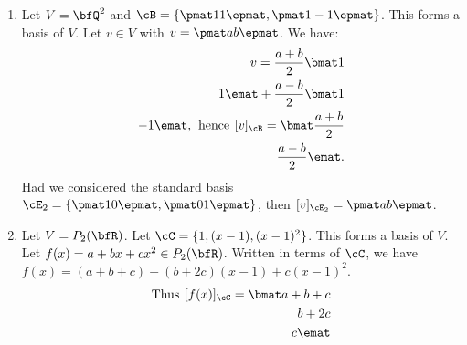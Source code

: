     
    \begin{example}
        \phantom{a}
        \begin{enumerate}[label = (\arabic*)]
            \item Let $V = \bfQ^2$ and $\cB = \{\pmat 1 \\ 1 \epmat, \pmat 1 \\ -1 \epmat \}$. This forms a basis of $V$. Let $v \in V$ with $v = \pmat a \\ b \epmat$. We have:
            \begin{equation*}
            \begin{split}
                v = \frac{a+b}{2} \bmat 1 \\ 1 \emat + \frac{a-b}{2} \bmat 1 \\ -1 \emat, \hspace{4pt} \text{hence} \hspace{4pt} [v]_\cB = \bmat \frac{a+b}{2} \\ \frac{a-b}{2} \emat.
            \end{split}
            \end{equation*}
            Had we considered the standard basis $\cE_2 = \{\pmat 1 \\ 0 \epmat , \pmat 0 \\ 1 \epmat \}$, then $[v]_{\cE_2} = \pmat a \\ b \epmat$.

            \item Let $V = P_2(\bfR)$. Let $\cC = \{1, (x-1), (x-1)^2 \}$. This forms a basis of $V$. Let $f(x) = a + bx + cx^2 \in P_2(\bfR)$. Written in terms of $\cC$, we have $f(x) = (a + b + c) + (b+2c)(x-1) + c(x-1)^2$.
                \begin{equation*}
                \begin{split}
                    \text{Thus} \hspace{4pt} [f(x)]_\cC = \bmat a+b+c \\ b+2c \\ c \emat
                \end{split}
                \end{equation*}
        \end{enumerate}
    \end{example}

